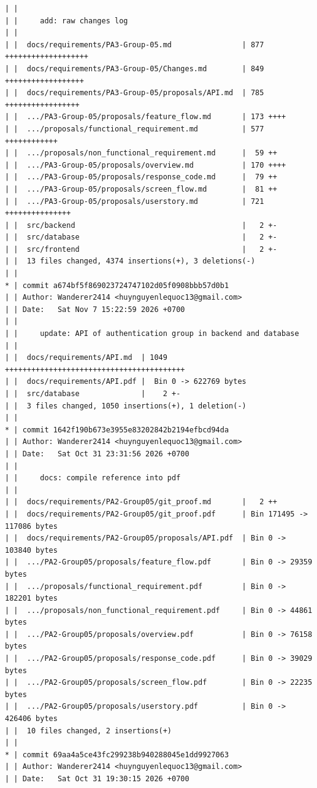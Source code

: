 \documentclass[12pt]{article}
\begin{document}
\begin{lstlisting}[numbers=none,breaklines=true]
| |
| |     add: raw changes log
| |
| |  docs/requirements/PA3-Group-05.md                | 877 +++++++++++++++++++
| |  docs/requirements/PA3-Group-05/Changes.md        | 849 ++++++++++++++++++
| |  docs/requirements/PA3-Group-05/proposals/API.md  | 785 +++++++++++++++++
| |  .../PA3-Group-05/proposals/feature_flow.md       | 173 ++++
| |  .../proposals/functional_requirement.md          | 577 ++++++++++++
| |  .../proposals/non_functional_requirement.md      |  59 ++
| |  .../PA3-Group-05/proposals/overview.md           | 170 ++++
| |  .../PA3-Group-05/proposals/response_code.md      |  79 ++
| |  .../PA3-Group-05/proposals/screen_flow.md        |  81 ++
| |  .../PA3-Group-05/proposals/userstory.md          | 721 +++++++++++++++
| |  src/backend                                      |   2 +-
| |  src/database                                     |   2 +-
| |  src/frontend                                     |   2 +-
| |  13 files changed, 4374 insertions(+), 3 deletions(-)
| |
* | commit a674bf5f869023724747102d05f0908bbb57d0b1
| | Author: Wanderer2414 <huynguyenlequoc13@gmail.com>
| | Date:   Sat Nov 7 15:22:59 2026 +0700
| |
| |     update: API of authentication group in backend and database
| |
| |  docs/requirements/API.md  | 1049 +++++++++++++++++++++++++++++++++++++++++
| |  docs/requirements/API.pdf |  Bin 0 -> 622769 bytes
| |  src/database              |    2 +-
| |  3 files changed, 1050 insertions(+), 1 deletion(-)
| |
* | commit 1642f190b673e3955e83202842b2194efbcd94da
| | Author: Wanderer2414 <huynguyenlequoc13@gmail.com>
| | Date:   Sat Oct 31 23:31:56 2026 +0700
| |
| |     docs: compile reference into pdf
| |
| |  docs/requirements/PA2-Group05/git_proof.md       |   2 ++
| |  docs/requirements/PA2-Group05/git_proof.pdf      | Bin 171495 -> 117086 bytes
| |  docs/requirements/PA2-Group05/proposals/API.pdf  | Bin 0 -> 103840 bytes
| |  .../PA2-Group05/proposals/feature_flow.pdf       | Bin 0 -> 29359 bytes
| |  .../proposals/functional_requirement.pdf         | Bin 0 -> 182201 bytes
| |  .../proposals/non_functional_requirement.pdf     | Bin 0 -> 44861 bytes
| |  .../PA2-Group05/proposals/overview.pdf           | Bin 0 -> 76158 bytes
| |  .../PA2-Group05/proposals/response_code.pdf      | Bin 0 -> 39029 bytes
| |  .../PA2-Group05/proposals/screen_flow.pdf        | Bin 0 -> 22235 bytes
| |  .../PA2-Group05/proposals/userstory.pdf          | Bin 0 -> 426406 bytes
| |  10 files changed, 2 insertions(+)
| |
* | commit 69aa4a5ce43fc299238b940288045e1dd9927063
| | Author: Wanderer2414 <huynguyenlequoc13@gmail.com>
| | Date:   Sat Oct 31 19:30:15 2026 +0700

\end{lstlisting}
\end{document}
